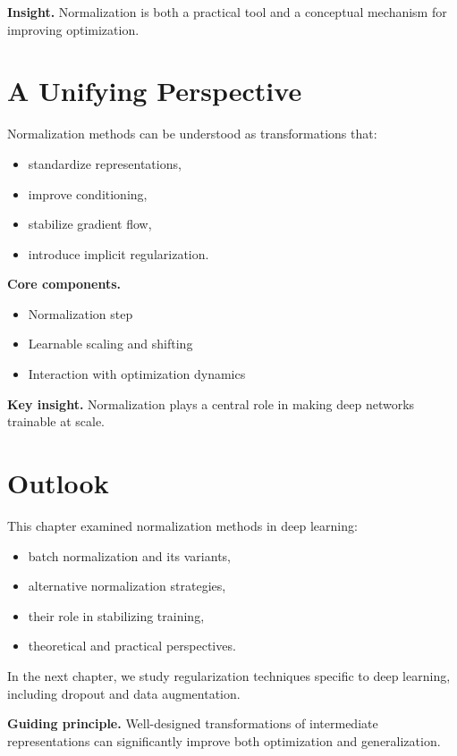 \noindent
\textbf{Insight.}  
Normalization is both a practical tool and a conceptual mechanism for improving optimization.

\section{A Unifying Perspective}

Normalization methods can be understood as transformations that:

\begin{itemize}
    \item standardize representations,
    \item improve conditioning,
    \item stabilize gradient flow,
    \item introduce implicit regularization.
\end{itemize}

\medskip

\noindent
\textbf{Core components.}
\begin{itemize}
    \item Normalization step
    \item Learnable scaling and shifting
    \item Interaction with optimization dynamics
\end{itemize}

\medskip

\noindent
\textbf{Key insight.}  
Normalization plays a central role in making deep networks trainable at scale.

\section{Outlook}

This chapter examined normalization methods in deep learning:
\begin{itemize}
    \item batch normalization and its variants,
    \item alternative normalization strategies,
    \item their role in stabilizing training,
    \item theoretical and practical perspectives.
\end{itemize}

\medskip

In the next chapter, we study regularization techniques specific to deep learning, including dropout and data augmentation.

\medskip

\noindent
\textbf{Guiding principle.}  
Well-designed transformations of intermediate representations can significantly improve both optimization and generalization.